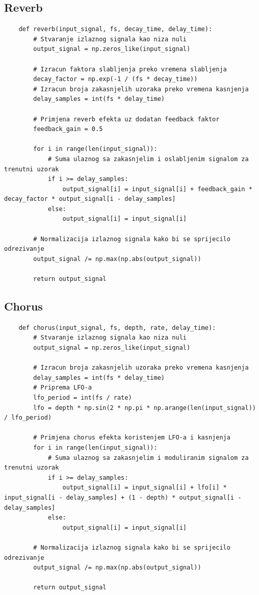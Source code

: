 \documentclass[times, utf8, seminar, numeric]{fer}
\begin{document}
\subsection{Reverb}
\begin{lstlisting}
	def reverb(input_signal, fs, decay_time, delay_time):
		# Stvaranje izlaznog signala kao niza nuli
		output_signal = np.zeros_like(input_signal)
		
		# Izracun faktora slabljenja preko vremena slabljenja
		decay_factor = np.exp(-1 / (fs * decay_time))
		# Izracun broja zakasnjelih uzoraka preko vremena kasnjenja
		delay_samples = int(fs * delay_time)
		
		# Primjena reverb efekta uz dodatan feedback faktor
		feedback_gain = 0.5
		
		for i in range(len(input_signal)):
			# Suma ulaznog sa zakasnjelim i oslabljenim signalom za trenutni uzorak
			if i >= delay_samples:
				output_signal[i] = input_signal[i] + feedback_gain * decay_factor * output_signal[i - delay_samples]
			else:
				output_signal[i] = input_signal[i]
		
		# Normalizacija izlaznog signala kako bi se sprijecilo odrezivanje
		output_signal /= np.max(np.abs(output_signal))
		
		return output_signal
\end{lstlisting}

\pagebreak
\subsection{Chorus}
\begin{lstlisting}
	def chorus(input_signal, fs, depth, rate, delay_time):
		# Stvaranje izlaznog signala kao niza nuli
		output_signal = np.zeros_like(input_signal)
		
		# Izracun broja zakasnjelih uzoraka preko vremena kasnjenja
		delay_samples = int(fs * delay_time)
		# Priprema LFO-a
		lfo_period = int(fs / rate)
		lfo = depth * np.sin(2 * np.pi * np.arange(len(input_signal)) / lfo_period)
		
		# Primjena chorus efekta koristenjem LFO-a i kasnjenja
		for i in range(len(input_signal)):
			# Suma ulaznog sa zakasnjelim i moduliranim signalom za trenutni uzorak
			if i >= delay_samples:
				output_signal[i] = input_signal[i] + lfo[i] * input_signal[i - delay_samples] + (1 - depth) * output_signal[i - delay_samples]
			else:
				output_signal[i] = input_signal[i]
		
		# Normalizacija izlaznog signala kako bi se sprijecilo odrezivanje
		output_signal /= np.max(np.abs(output_signal))
		
		return output_signal
\end{lstlisting}
\end{document}
